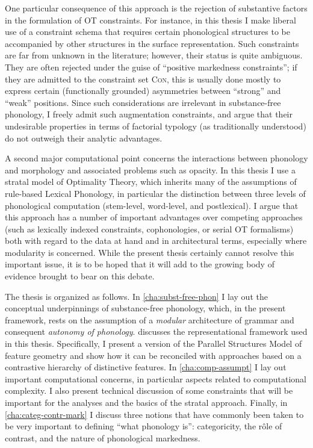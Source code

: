 One particular consequence of this approach is the rejection of substantive factors in the formulation of OT constraints. For instance, in this thesis I make liberal use of a constraint schema that requires certain phonological structures to be accompanied by other structures in the surface representation. Such constraints are far from unknown in the literature; however, their status is quite ambiguous. They are often rejected under the guise of \enquote{positive markedness constraints}; if they are admitted to the constraint set \textsc{Con}, this is usually done mostly to express certain (functionally grounded) asymmetries between \enquote{strong} and \enquote{weak} positions. Since such considerations are irrelevant in substance\hyp free phonology, I freely admit such augmentation constraints, and argue that their undesirable properties in terms of factorial typology (as traditionally understood) do not outweigh their analytic advantages.

A second major computational point concerns the interactions between phonology and morphology and associated problems such as opacity. In this thesis I use a stratal model of Optimality Theory, which inherits many of the assumptions of rule\hyp based Lexical Phonology, in particular the distinction between three levels of phonological computation (stem\hyp level, word\hyp level, and postlexical). I argue that this approach has a number of important advantages over competing approaches (such as lexically indexed constraints, cophonologies, or serial OT formalisms) both with regard to the data at hand and in architectural terms, especially where modularity is concerned. While the present thesis certainly cannot resolve this important issue, it is to be hoped that it will add to the growing body of evidence brought to bear on this debate.

The thesis is organized as follows. In \cref{cha:subst-free-phon} I lay out the conceptual underpinnings of substance\hyp free phonology, which, in the present framework, rests on the assumption of a \emph{modular} architecture of grammar and consequent \emph{autonomy of phonology}.  discusses the representational framework used in this thesis. Specifically, I present a version of the Parallel Structures Model of feature geometry and show how it can be reconciled with approaches based on a contrastive hierarchy of distinctive features. In \cref{cha:comp-assumpt} I lay out important computational concerns, in particular aspects related to computational complexity. I also present technical discussion of some constraints that will be important for the analyses and the basics of the stratal approach. Finally, in \cref{cha:categ-contr-mark} I discuss three notions that have commonly been taken to be very important to defining \enquote{what phonology is}: categoricity, the rôle of contrast, and the nature of phonological markedness.

